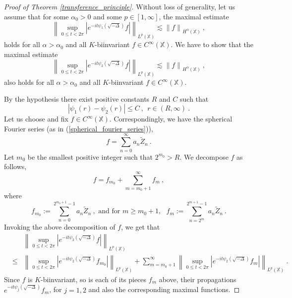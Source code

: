 \documentclass[12pt]{amsart}
\theoremstyle{definition}
\newcommand{\X}{\mathbb X}%
\numberwithin{equation}{section}
\begin{document}
\begin{proof}[Proof of Theorem \ref{transference_principle}]
Without loss of generality, let us assume that for some $\alpha_0>0$ and some $p \in [1,\infty]$, the maximal estimate 
\begin{equation} \label{transference_pf_eq1}
\left\|\sup_{0 \le t < 2\pi} \left|e^{-it\psi_1\left(\sqrt{-\Delta}\right)} f \right|\right\|_{L^p(\X)} \lesssim {\|f\|}_{H^\alpha(\X)}\:,
\end{equation}
holds for all $\alpha >\alpha_0$ and all $K$-biinvariant $f \in C^\infty(\X)$. We have to show that the maximal estimate 
\begin{equation} \label{transference_pf_eq2}
\left\|\sup_{0 \le t < 2\pi} \left|e^{-it\psi_2\left(\sqrt{-\Delta}\right)} f \right|\right\|_{L^p(\X)} \lesssim {\|f\|}_{H^\alpha(\X)}\:,
\end{equation}
also holds for all $\alpha >\alpha_0$ and all $K$-biinvariant $f \in C^\infty(\X)$.

By the hypothesis there exist positive constants $R$ and $C$ such that 
\begin{equation} \label{transference_pf_eq3}
\left|\psi_1(r)-\psi_2(r)\right| \le C\:,\:\: r \in (R, \infty)\:.
\end{equation} 
Let us choose and fix $f \in C^\infty(\X)$. Correspondingly, we have the spherical Fourier series (as in (\ref{spherical_fourier_series})),
\begin{equation*}
f = \sum_{n=0}^\infty a_n \tilde{Z}_n\:.
\end{equation*}
Let $m_0$ be the smallest positive integer such that $2^{m_0}> R$. We decompose $f$ as follows,
\begin{equation*} 
f=f_{m_0} + \sum_{m=m_0+1}^\infty f_m\:,
\end{equation*}
where 
\begin{equation*}
f_{m_0}:= \sum_{n=0}^{2^{m_0+1}-1} a_n \tilde{Z}_n \:, \text{ and for } m \ge m_0+1,\:\:\: f_m :=  \sum_{n=2^m}^{2^{m+1}-1} a_n \tilde{Z}_n\:.
\end{equation*}
Invoking the above decomposition of $f$, we get that
\begin{eqnarray} \label{transference_pf_eq4}
&&\left\|\sup_{0 \le t < 2\pi} \left|e^{-it\psi_2\left(\sqrt{-\Delta}\right)} f \right|\right\|_{L^p(\X)}\nonumber\\
 & \le & \left\|\sup_{0 \le t < 2\pi} \left|e^{-it\psi_2\left(\sqrt{-\Delta}\right)} f_{m_0} \right|\right\|_{L^p(\X)} + \sum_{m=m_0+1}^\infty \left\|\sup_{0 \le t < 2\pi} \left|e^{-it\psi_2\left(\sqrt{-\Delta}\right)} f_m \right|\right\|_{L^p(\X)}\:.
\end{eqnarray}
Since $f$ is $K$-biinvariant, so is each of its pieces $f_m$ above, their propagations $e^{-it\psi_j\left(\sqrt{-\Delta}\right)} f_m$, for $j=1,2$ and also the corresponding maximal functions.  


\end{proof}
\end{document}
